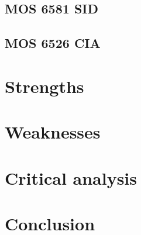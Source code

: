 \documentclass{article}
\begin{document}
\subsection{MOS 6581 SID}

\subsection{MOS 6526 CIA}

\section{Strengths}

\section{Weaknesses}

\section{Critical analysis}

\section{Conclusion}
\end{document}
